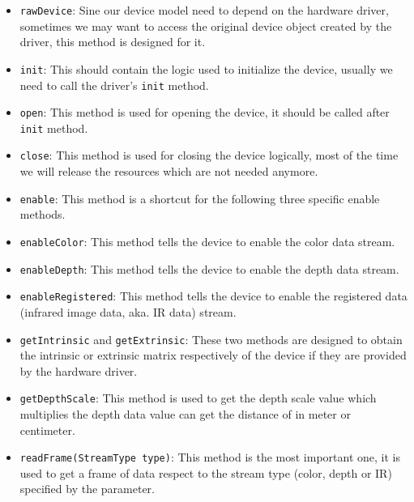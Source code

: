 \begin{itemize}
    \item \texttt{rawDevice}: Sine our device model need to depend on
    the hardware driver, sometimes we may want to access the original device
    object created by the driver, this method is designed for it.

    \item \texttt{init}: This should contain the logic used to initialize
    the device, usually we need to call the driver's \texttt{init} method.

    \item \texttt{open}: This method is used for opening the device, it
    should be called after \texttt{init} method.

    \item \texttt{close}: This method is used for closing the device
    logically, most of the time we will release the resources which are not
    needed anymore.

    \item \texttt{enable}: This method is a shortcut for the following
    three specific enable methods.

    \item \texttt{enableColor}: This method tells the device to enable
    the color data stream.

    \item \texttt{enableDepth}: This method tells the device to enable
    the depth data stream.

    \item \texttt{enableRegistered}: This method tells the device to
    enable the registered data (infrared image data, aka. IR data) stream.

    \item \texttt{getIntrinsic} and \texttt{getExtrinsic}:
    These two methods are designed to obtain the intrinsic or extrinsic matrix
    respectively of the device if they are provided by the hardware driver.

    \item \texttt{getDepthScale}: This method is used to get the depth
    scale value which multiplies the depth data value can get the distance of
    in meter or centimeter.

    \item \texttt{readFrame(StreamType type)}: This method is the
    most important one, it is used to get a frame of data respect to the stream
    type (color, depth or IR) specified by the parameter.
\end{itemize}

